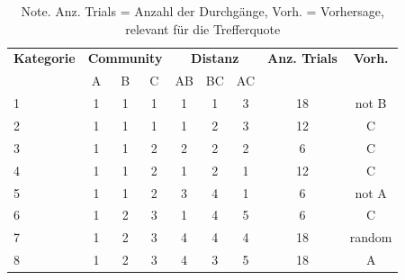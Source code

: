 \appendix



\begin{table}[h]
\centering
\captionsetup{justification=centering, margin = 1cm}
\begin{tabular}{l c c c c c c c c}
\hline
\textbf{Kategorie} & \multicolumn{3}{c}{\textbf{Community}} &  \multicolumn{3}{c}{\textbf{Distanz}} & \textbf{Anz. Trials} & \textbf{Vorh.}\\
& A & B & C & AB & BC & AC \\
\hline
1 & 1 & 1 & 1 & 1 & 1 & 3 & 18 & not B\\
2 & 1 & 1 & 1 & 1 & 2 & 3 & 12 & C\\
3 & 1 & 1 & 2 & 2 & 2 & 2 & 6 & C\\
4 & 1 & 1 & 2 & 1 & 2 & 1 & 12 & C\\
5 & 1 & 1 & 2 & 3 & 4 & 1 & 6 & not A\\
6 & 1 & 2 & 3 & 1 & 4 & 5 & 6 & C\\
7 & 1 & 2 & 3 & 4 & 4 & 4 & 18 & random\\
8 & 1 & 2 & 3 & 4 & 3 & 5 & 18 & A\\
\hline
\end{tabular}
\caption{Note. Anz. Trials = Anzahl der Durchgänge, Vorh. = Vorhersage, relevant für die Trefferquote}
\end{table}


